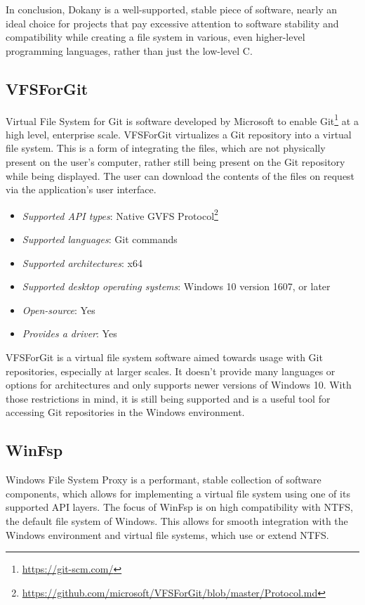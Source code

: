 In conclusion, Dokany is a well-supported, stable piece of software, nearly an ideal choice for projects that pay excessive attention to software stability and compatibility while creating a file system in various, even higher-level programming languages, rather than just the low-level C.\cite{GitDokany}\cite{DokanDevIo}

\subsection{VFSForGit}
Virtual File System for Git is software developed by Microsoft to enable Git\footnote{\url{https://git-scm.com/}} at a high level, enterprise scale. VFSForGit virtualizes a Git repository into a virtual file system. This is a form of integrating the files, which are not physically present on the user's computer, rather still being present on the Git repository while being displayed. The user can download the contents of the files on request via the application's user interface. 

\begin{itemize}
    \item \textit{Supported API types}: Native GVFS Protocol\footnote{\url{https://github.com/microsoft/VFSForGit/blob/master/Protocol.md}}
    \item \textit{Supported languages}: Git commands
    \item \textit{Supported architectures}: x64
    \item \textit{Supported desktop operating systems}: Windows 10 version 1607, or later
    \item \textit{Open-source}: Yes
    \item \textit{Provides a driver}: Yes
\end{itemize}

VFSForGit is a virtual file system software aimed towards usage with Git repositories, especially at larger scales. It doesn't provide many languages or options for architectures and only supports newer versions of Windows 10. With those restrictions in mind, it is still being supported and is a useful tool for accessing Git repositories in the Windows environment.\cite{GitVfsForGit}\cite{VfsForGitMS}

\subsection{WinFsp}
Windows File System Proxy is a performant, stable collection of software components, which allows for implementing a virtual file system using one of its supported API layers. The focus of WinFsp is on high compatibility with NTFS, the default file system of Windows. This allows for smooth integration with the Windows environment and virtual file systems, which use or extend NTFS.

